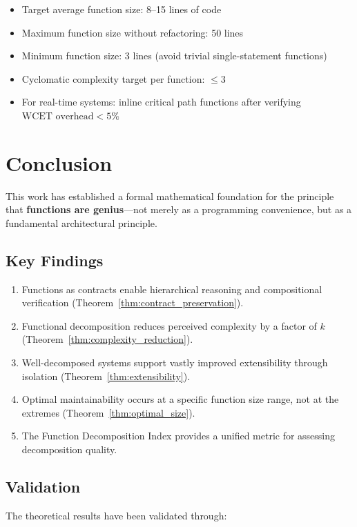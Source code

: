 \documentclass[a4paper,12pt]{article}
\theoremstyle{definition}
\begin{document}
\begin{itemize}
	\item Target average function size: 8--15 lines of code
	\item Maximum function size without refactoring: 50 lines
	\item Minimum function size: 3 lines (avoid trivial single-statement functions)
	\item Cyclomatic complexity target per function: $\leq 3$
	\item For real-time systems: inline critical path functions after verifying $\text{WCET overhead} < 5\%$
\end{itemize}

\section{Conclusion}

This work has established a formal mathematical foundation for the principle that \textbf{functions are genius}—not merely as a programming convenience, but as a fundamental architectural principle.

\subsection{Key Findings}

\begin{enumerate}
	\item Functions as contracts enable hierarchical reasoning and compositional verification (Theorem~\ref{thm:contract_preservation}).
	\item Functional decomposition reduces perceived complexity by a factor of $k$ (Theorem~\ref{thm:complexity_reduction}).
	\item Well-decomposed systems support vastly improved extensibility through isolation (Theorem~\ref{thm:extensibility}).
	\item Optimal maintainability occurs at a specific function size range, not at the extremes (Theorem~\ref{thm:optimal_size}).
	\item The Function Decomposition Index provides a unified metric for assessing decomposition quality.
\end{enumerate}

\subsection{Validation}

The theoretical results have been validated through:
\end{document}

